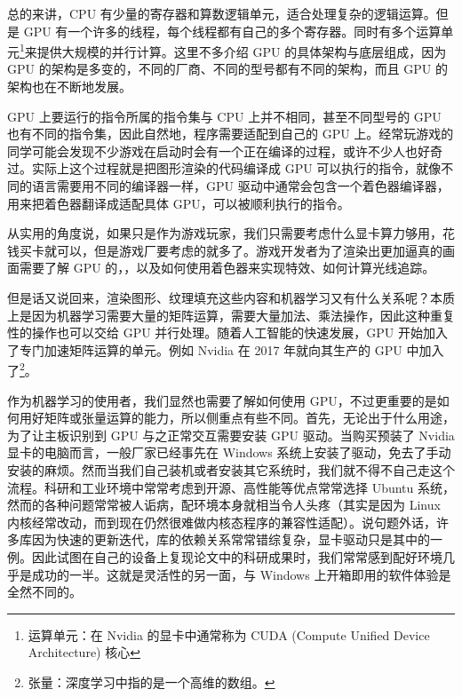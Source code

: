 总的来讲，CPU 有少量的寄存器和算数逻辑单元，适合处理复杂的逻辑运算。但是 GPU 有一个许多的线程，每个线程都有自己的多个寄存器。同时有多个运算单元\footnote{运算单元：在 Nvidia 的显卡中通常称为 CUDA (Compute Unified Device Architecture) 核心}来提供大规模的并行计算。这里不多介绍 GPU 的具体架构与底层组成，因为 GPU 的架构是多变的，不同的厂商、不同的型号都有不同的架构，而且 GPU 的架构也在不断地发展。

GPU 上要运行的指令所属的指令集与 CPU 上并不相同，甚至不同型号的 GPU 也有不同的指令集，因此自然地，程序需要适配到自己的 GPU 上。经常玩游戏的同学可能会发现不少游戏在启动时会有一个正在编译的过程，或许不少人也好奇过。实际上这个过程就是把图形渲染的代码编译成 GPU 可以执行的指令，就像不同的语言需要用不同的编译器一样，GPU 驱动中通常会包含一个着色器编译器，用来把着色器翻译成适配具体 GPU，可以被顺利执行的指令。

从实用的角度说，如果只是作为游戏玩家，我们只需要考虑什么显卡算力够用，花钱买卡就可以，但是游戏厂要考虑的就多了。游戏开发者为了渲染出更加逼真的画面需要了解 GPU 的，，以及如何使用着色器来实现特效、如何计算光线追踪。

但是话又说回来，渲染图形、纹理填充这些内容和机器学习又有什么关系呢？本质上是因为机器学习需要大量的矩阵运算，需要大量加法、乘法操作，因此这种重复性的操作也可以交给 GPU 并行处理。随着人工智能的快速发展，GPU 开始加入了专门加速矩阵运算的单元。例如 Nvidia 在 2017 年就向其生产的 GPU 中加入了\footnote{张量：深度学习中指的是一个高维的数组。}。

作为机器学习的使用者，我们显然也需要了解如何使用 GPU，不过更重要的是如何用好矩阵或张量运算的能力，所以侧重点有些不同。首先，无论出于什么用途，为了让主板识别到 GPU 与之正常交互需要安装 GPU 驱动。当购买预装了 Nvidia 显卡的电脑而言，一般厂家已经事先在 Windows 系统上安装了驱动，免去了手动安装的麻烦。然而当我们自己装机或者安装其它系统时，我们就不得不自己走这个流程。科研和工业环境中常常考虑到开源、高性能等优点常常选择 Ubuntu 系统，然而的各种问题常常被人诟病，配环境本身就相当令人头疼（其实是因为 Linux 内核经常改动，而到现在仍然很难做内核态程序的兼容性适配）。说句题外话，许多库因为快速的更新迭代，库的依赖关系常常错综复杂，显卡驱动只是其中的一例。因此试图在自己的设备上复现论文中的科研成果时，我们常常感到配好环境几乎是成功的一半。这就是灵活性的另一面，与 Windows 上开箱即用的软件体验是全然不同的。

